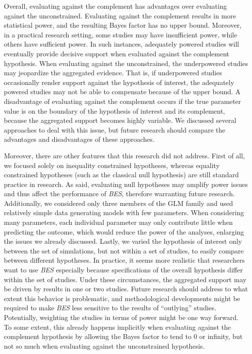 \documentclass[
]{article}
\begin{document}
Overall, evaluating against the complement has advantages over
evaluating against the unconstrained. Evaluating against the complement
results in more statistical power, and the resulting Bayes factor has no
upper bound. Moreover, in a practical research setting, some studies may
have insufficient power, while others have sufficient power. In such
instances, adequately powered studies will eventually provide decisive
support when evaluated against the complement hypothesis. When
evaluating against the unconstrained, the underpowered studies may
jeopardize the aggregated evidence. That is, if underpowered studies
occasionally render support against the hypothesis of interest, the
adequately powered studies may not be able to compensate because of the
upper bound. A disadvantage of evaluating against the complement occurs
if the true parameter value is on the boundary of the hypothesis of
interest and its complement, because the aggregated support becomes
highly variable. We discussed several approaches to deal with this
issue, but future research should compare the advantages and
disadvantages of these approaches.

Moreover, there are other features that this research did not address.
First of all, we focused solely on inequality constrained hypotheses,
whereas equality constrained hypotheses (such as the classical null
hypothesis) are still standard practice in research. As said, evaluating
null hypotheses may amplify power issues and thus affect the performance
of \emph{BES}, therefore warranting future research. Additionally, we
considered only three members of the GLM family and used relatively
simple data generating models with few parameters. When considering many
parameters, each individual parameter may only contribute little when
predicting the outcome, which would reduce the power of the analyses,
enlarging the issues we already discussed. Lastly, we varied the
hypothesis of interest only between the set of simulations, but not
within a set of studies, to easily compare between different hypotheses.
In practice, it seems more realistic that researchers want to use
\emph{BES} especially because specifications of the overall hypothesis
differ within the set of studies. Under these circumstances, the
aggregated support may be driven by results in one or two studies.
Future research should address to what extent this behavior is
problematic, and methodological developments might be required to make
\emph{BES} less sensitive to the results of ``outlying'' studies.
Potentially, weighting the studies in terms of power might be one way
forward. To some extent, this already happens implicitly when evaluating
against the complement hypothesis by allowing the Bayes factor to tend
to 0 or infinity, but not so much when evaluating against the
unconstrained hypothesis.
\end{document}
